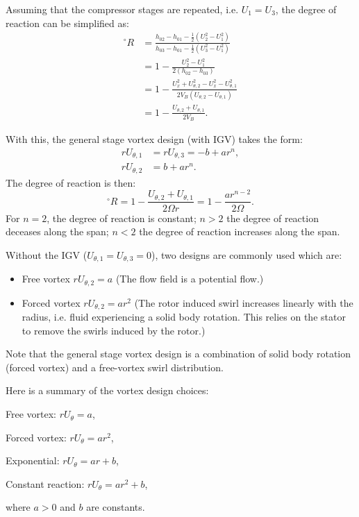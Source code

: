 Assuming that the compressor stages are repeated, i.e. $U_1 = U_3$, the degree of reaction can be simplified as:
\begin{align}
	^\circ R &= \frac{h_{02} - h_{01} - \frac{1}{2}\left(U_2^2 - U_1^2\right)}{h_{03} - h_{01} - \frac{1}{2}\left(U_3^2 - U_1^2\right)} \nonumber \\
			 &= 1 - \frac{U_2^2 - U_1^2}{2(h_{02} - h_{03})} \nonumber \\
			 &= 1 - \frac{U_x^2 + U_{\theta,2}^2 - U_x^2 - U_{\theta,1}^2}{2 V_B (U_{\theta,2} - U_{\theta, 1})} \nonumber \\
			 &= 1 - \frac{U_{\theta, 2} + U_{\theta, 1}}{2 V_B}.
\end{align}

With this, the general stage vortex design (with IGV) takes the form:
\begin{align}
	r U_{\theta,1} &= r U_{\theta,3} = -b + a r^n, \\
	r U_{\theta,2} &= b + a r^n.
\end{align}
The degree of reaction is then:
\begin{equation}
	^\circ R = 1 - \frac{U_{\theta,2} + U_{\theta,1}}{2 \Omega r} = 1 - \frac{a r^{n-2}}{2\Omega}.
\end{equation}
For $n=2$, the degree of reaction is constant; $n>2$ the degree of reaction deceases along the span; $n<2$ the degree of reaction increases along the span.

Without the IGV ($U_{\theta,1} = U_{\theta,3} = 0$), two designs are commonly used which are:
\begin{itemize}
	\item Free vortex $rU_{\theta,2}=a$ (The flow field is a potential flow.)
	\item Forced vortex $rU_{\theta,2}=ar^2$ (The rotor induced swirl increases linearly with the radius, i.e. fluid experiencing a solid body rotation. This relies on the stator to remove the swirls induced by the rotor.)
\end{itemize}

Note that the general stage vortex design is a combination of solid body rotation (forced vortex) and a free-vortex swirl distribution.

Here is a summary of the vortex design choices:
\begin{itemizePacked}
\item Free vortex: $rU_\theta = a$,
\item Forced vortex: $rU_\theta = a r^2$,
\item Exponential: $rU_\theta = a r + b$,
\item Constant reaction: $rU_\theta = a r^2 + b$,
\end{itemizePacked}
where $a > 0$ and $b$ are constants.


